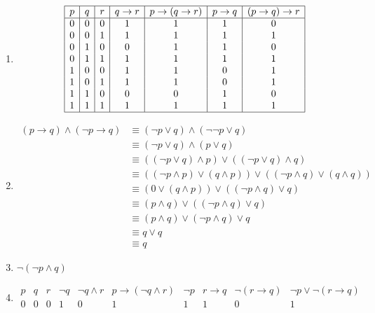 \documentclass[12pt]{article}
\newcommand{\enumset}[1]{\setcounter{enumi}{#1}}
\begin{document}
\begin{enumerate}
			\item
				\[\begin{array}{|*{8}{c|}}\hline
					p & q & r & q \to r & p \to (q \to r)  & p \to q & (p \to q) \to r \\\hline
					0 & 0 & 0 & 1 & 1 & 1 & 0 \\
					0 & 0 & 1 & 1 & 1 & 1 & 1 \\
					0 & 1 & 0 & 0 & 1 & 1 & 0 \\
					0 & 1 & 1 & 1 & 1 & 1 & 1 \\
					1 & 0 & 0 & 1 & 1 & 0 & 1 \\
					1 & 0 & 1 & 1 & 1 & 0 & 1 \\
					1 & 1 & 0 & 0 & 0 & 1 & 0 \\
					1 & 1 & 1 & 1 & 1 & 1 & 1 \\\hline
				\end{array}\]
			\item
				\begin{align*}
					(p \to q) \land (\lnot p \to q) &\equiv (\lnot p \lor q) \land (\lnot \lnot p \lor q) \tag{definition of \(\to\)} \\
						&\equiv (\lnot p \lor q) \land (p \lor q) \tag{double negation} \\
						&\equiv ((\lnot p \lor q) \land p) \lor ((\lnot p \lor q) \land q) \tag{distributive property} \\
						&\equiv ((\lnot p \land p) \lor (q \land p)) \lor ((\lnot p \land q) \lor (q \land q)) \tag{distributive property} \\
						&\equiv (0 \lor (q \land p)) \lor ((\lnot p \land q) \lor q) &\tag{contradiction/identity} \\
						&\equiv (p \land q) \lor ((\lnot p \land q) \lor q) \tag{identity} \\
						&\equiv (p \land q) \lor (\lnot p \land q) \lor q \tag{associativity} \\
						&\equiv q \lor q \\
						&\equiv q
				\end{align*}
			\item
				\(\lnot(\lnot p \land q)\)
			\enumset{25}
			\item
				\[\begin{array}{|*{10}{c|}}\hline
					p & q & r & \lnot q & \lnot q \land r & p \to (\lnot q \land r) & \lnot p & r \to q & \lnot (r \to q) & \lnot p \lor \lnot (r \to q) \\\hline
					0 & 0 & 0 & 1 & 0 & 1 & 1 & 1 & 0 & 1 \\

\end{array}\]
\end{enumerate}
\end{document}
